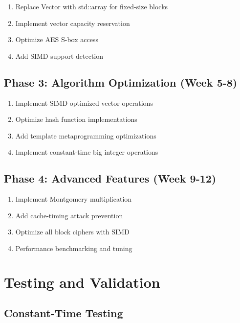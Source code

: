 \documentclass[11pt,a4paper]{article}
\begin{document}
\begin{enumerate}
    \item Replace Vector with std::array for fixed-size blocks
    \item Implement vector capacity reservation
    \item Optimize AES S-box access
    \item Add SIMD support detection
\end{enumerate}

\subsection{Phase 3: Algorithm Optimization (Week 5-8)}

\begin{enumerate}
    \item Implement SIMD-optimized vector operations
    \item Optimize hash function implementations
    \item Add template metaprogramming optimizations
    \item Implement constant-time big integer operations
\end{enumerate}

\subsection{Phase 4: Advanced Features (Week 9-12)}

\begin{enumerate}
    \item Implement Montgomery multiplication
    \item Add cache-timing attack prevention
    \item Optimize all block ciphers with SIMD
    \item Performance benchmarking and tuning
\end{enumerate}

\section{Testing and Validation}

\subsection{Constant-Time Testing}
\end{document}
